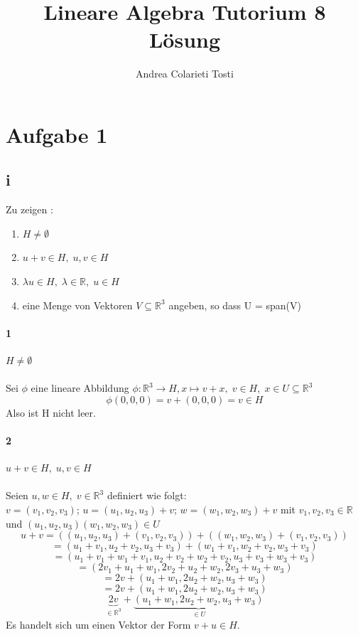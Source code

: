 \documentclass[10pt,a4paper]{article}
\author{Andrea Colarieti Tosti}
\title{Lineare Algebra Tutorium 8 Lösung}
\begin{document}
 \maketitle
 \newpage
 
 \section{Aufgabe 1}
 \subsection{i}
 Zu zeigen :
 \begin{enumerate}
 \item $H \neq \emptyset$
 \item $ u+v \in H , \; u,v \in H$
 \item $ \lambda u \in H, \; \lambda \in \mathbb{R}, \; u \in H $
 \item eine Menge von Vektoren $V \subseteq \mathbb{R}^3$ angeben, so dass U = span(V)
 \end{enumerate}
 \paragraph{1} $H \neq \emptyset$\\\\
 Sei $\phi$ eine lineare Abbildung $\phi: \mathbb{R}^3 \rightarrow H , x \mapsto v + x, \; v \in H, \; x \in U \subseteq \mathbb{R}^3 $\\
 $$ \phi(0,0,0) = v + (0,0,0) = v \in H $$
 Also ist H nicht leer.
 \paragraph{2} $ u+v \in H , \; u,v \in H$\\\\
 Seien $u,w \in H , \; v \in \mathbb{R}^3$ definiert wie folgt:\\
  $v=(v_1,v_2,v_3)$; $u=(u_1,u_2,u_3)+v$; $w=(w_1,w_2,w_3)+v$ mit $v_1,v_2,v_3 \in \mathbb{R}$ und   $(u_1,u_2,u_3)(w_1,w_2,w_3) \in U$ \\
  $$ u+ v = ((u_1,u_2,u_3)+(v_1,v_2,v_3))+((w_1,w_2,w_3)+(v_1,v_2,v_3))$$
  $$= (u_1+v_1,u_2+v_2,u_3+v_3)+(w_1+v_1,w_2+v_2,w_3+v_3) $$
  $$= (u_1+v_1+w_1+v_1,u_2+v_2+w_2+v_2,u_3+v_3+w_3+v_3)$$
  $$= (2v_1+u_1+w_1,2v_2+u_2+w_2,2v_3+u_3+w_3)$$
  $$= 2v+(u_1+w_1,2u_2+w_2,u_3+w_3) $$
  $$= 2v+(u_1+w_1,2u_2+w_2,u_3+w_3) $$
  $$\underbrace{2v}_{\in \mathbb{R}^3}+\underbrace{(u_1+w_1,2u_2+w_2,u_3+w_3)}_{\in U}$$
  Es handelt sich um einen Vektor der Form $v + u \in H$.
\end{document}
